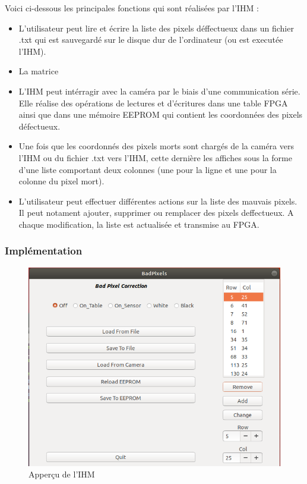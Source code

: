 Voici ci-dessous les principales fonctions qui sont réalisées par l'IHM : 
\newline
\begin{itemize}
	\item L'utilisateur peut lire et écrire la liste des pixels déffectueux dans un fichier .txt qui est sauvegardé sur le disque dur de l'ordinateur (ou est executée l'IHM). 
	\item La matrice
	\item L'IHM peut intérragir avec la caméra par le biais d'une communication série. Elle réalise des opérations de lectures et d'écritures dans une table FPGA ainsi que dans une mémoire EEPROM qui contient les coordonnées des pixels défectueux. 
	\item Une fois que les coordonnés des pixels morts sont chargés de la caméra vers l'IHM ou du fichier .txt vers l'IHM, cette dernière les affiches sous la forme d'une liste comportant deux colonnes (une pour la ligne et une pour la colonne du pixel mort). 
	\item L'utilisateur peut effectuer différentes actions sur la liste des mauvais pixels. Il peut notament ajouter, supprimer ou remplacer des pixels deffectueux. A chaque modification, la liste est actualisée et transmise au FPGA.

\end{itemize}

\subsubsection{Implémentation}

\begin{figure}[ht]
    \centering
    \includegraphics[scale=0.45]{img/IHM.png}
    \caption{Apperçu de l'IHM}
    \label{fig:CameraCmdsettings}
\end{figure}

